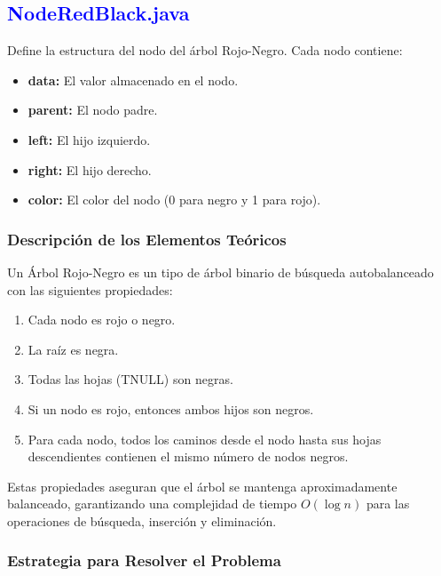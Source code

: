 \documentclass[12pt]{article}
\begin{document}
\subsection{\textcolor{blue}{NodeRedBlack.java}}
Define la estructura del nodo del árbol Rojo-Negro. Cada nodo contiene:
\begin{itemize}
    \item \textbf{data:} El valor almacenado en el nodo.
    \item \textbf{parent:} El nodo padre.
    \item \textbf{left:} El hijo izquierdo.
    \item \textbf{right:} El hijo derecho.
    \item \textbf{color:} El color del nodo (0 para negro y 1 para rojo).
\end{itemize}

\subsubsection{Descripción de los Elementos Teóricos}

Un Árbol Rojo-Negro es un tipo de árbol binario de búsqueda autobalanceado con las siguientes propiedades:
\begin{enumerate}
    \item Cada nodo es rojo o negro.
    \item La raíz es negra.
    \item Todas las hojas (TNULL) son negras.
    \item Si un nodo es rojo, entonces ambos hijos son negros.
    \item Para cada nodo, todos los caminos desde el nodo hasta sus hojas descendientes contienen el mismo número de nodos negros.
\end{enumerate}

Estas propiedades aseguran que el árbol se mantenga aproximadamente balanceado, garantizando una complejidad de tiempo \(O(\log n)\) para las operaciones de búsqueda, inserción y eliminación.

\subsubsection{Estrategia para Resolver el Problema}
\end{document}
